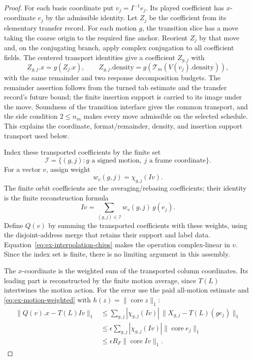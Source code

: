 \begin{proof}
For each basis coordinate put $v_j=I^{-1}e_j$. Its played coefficient has
$x$-coordinate $e_j$ by the admissible identity. Let $Z_j$ be the coefficient
from its elementary transfer record. For each motion $g$, the transition slice has a
move taking the coarse origin to the required fine anchor. Reorient $Z_j$
by that move and, on the conjugating branch, apply complex conjugation to all
coefficient fields. The centered transport identities give a coefficient
$Z_{g,j}$ with
\[
 Z_{g,j}.x=g(Z_j.x),\qquad
 Z_{g,j}.\mathrm{density}=g\!\left(\mathcal T_m
                   (V(v_j).\mathrm{density})\right),
\]
with the same remainder and two response decomposition budgets. The remainder assertion
follows from the turned tab estimate and the transfer record's future bound; the
finite insertion support is carried to its image under the move. Soundness of the
transition interface gives the common transport, and the side condition $2\leq
n_m$ makes every move admissible on the selected schedule. This explains the
coordinate, format/remainder, density, and insertion support transport used below.

Index these transported coefficients by the finite set
\[
 \mathcal I=\{(g,j):g\text{ a signed motion},\ j\text{ a frame coordinate}\}.
\]
For a vector $v$, assign weight
\[
       w_v(g,j)=\chi_{g,j}(Iv).
\]
The finite orbit coefficients are the averaging/rebasing coefficients; their
identity is the finite reconstruction formula
\begin{equation}
       Iv=\sum_{(g,j)\in\mathcal I}
                w_v(g,j)\,g(e_j).
       \label{eq:ex-interpolation-chips}
\end{equation}
Define $Q(v)$ by summing the transported coefficients with these weights,
using the disjoint-address merge that retains their support and label data.
Equation~\eqref{eq:ex-interpolation-chips} makes the operation complex-linear
in $v$. Since the index set is finite, there is no limiting argument in this
assembly.

The $x$-coordinate is the weighted sum of the transported column
coordinates. Its leading part is reconstructed by the finite motion average,
since $T(L)$ intertwines the motion action. For the error use the paid
all-motion estimate and \eqref{eq:ex-motion-weighted} with
$h(z)=\|\operatorname{core}z\|_1$:
\[
\begin{aligned}
 \|Q(v).x-T(L)Iv\|_1
 &\le \sum_{g,j}|\chi_{g,j}(Iv)|\,
       \|X_{g,j}-T(L)(g e_j)\|_1\\
 &\le \epsilon\sum_{g,j}|\chi_{g,j}(Iv)|
                      \|\operatorname{core}e_j\|_1\\
 &\le \epsilon R_F\|\operatorname{core}Iv\|_1.
\end{aligned}
\]


\end{proof}
